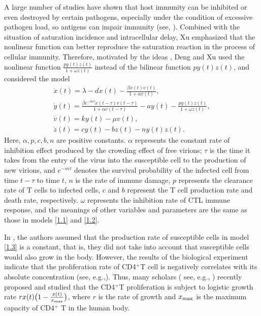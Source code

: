 \documentclass[reqno]{amsart}
\begin{document}
A large number of studies have shown that host immunity can be inhibited or even 
destroyed by certain pathogens, especially under the condition of excessive pathogen 
load, so antigens can impair immunity
(see,  \cite{RW,WS}). Combined with the situation of saturation incidence and 
intracellular delay, Xu \cite{X}  emphasized that the nonlinear function can better
reproduce the saturation reaction in the process of cellular immunity. 
Therefore, motivated by the ideas \cite{HZ, LX, WL, WS},
Deng and Xu \cite{DX} used the nonlinear function $\frac{py(t)z(t)}{1+\omega z(t)}$ 
instead of the bilinear function $py(t)z(t)$, and considered the model
\begin{equation}\label{1.3}
\begin{gathered}
\dot{x}(t)=\lambda-dx(t)-{\frac{\beta x(t)v(t)}{1+\alpha v(t)}},\\
\dot{y}(t)={\frac{\beta e^{-m\tau}x(t-\tau)v(t-\tau)}{1+\alpha v(t-\tau)}}
-ay(t)-{\frac{py(t)z(t)}{1+\omega z(t)}},\\
\dot{v}(t)=ky(t)- \mu v(t),\\
\dot{z}(t)=cy(t)-bz(t)-ny(t)z(t).
\end{gathered}
\end{equation}
Here, $\alpha, p, c, b, n$ are positive constants. $\alpha$ represents the constant 
rate of inhibition effect produced by the crowding effect of free virions;
$\tau$ is the time it takes from the entry of the virus into the susceptible cell to 
the production of new virions, and $e^{-m\tau}$ denotes the survival
probability of the infected cell from time $t-\tau$ to time $t$, $n$ is the rate of 
immune damage, $p$ represents the clearance rate of T cells to infected cells,
$c$ and $b$ represent the T cell production rate and death rate, respectively. 
$\omega$ represents the inhibition rate of CTL
immune response, and the meanings of other variables and parameters are the same as 
those in models \eqref{1.1} and \eqref{1.2}.

In \cite{DX}, the authors assumed that the production rate of susceptible cells in model 
\eqref{1.3} is a constant, that is, they did not take into account that susceptible 
cells  would also grow in the body. However, the results of the biological experiment 
indicate that the proliferation rate of CD4$^+$T cell is negatively
correlates with its absolute concentration (see, e.g.,\cite{BR}). 
Thus, many  scholars ( see, e.g., \cite {LGM, LS, PC, WLL, ZZZ})  recently 
proposed and studied that the  CD4$^+$T  proliferation is subject to logistic growth 
rate $rx(t)\big(1-\frac{x(t)}{x_{\rm max}}\big)$,  where $r$ is the rate of growth and
$x_{\rm max}$ is the maximum capacity of CD4$^+$ T in the human body.
\end{document}
